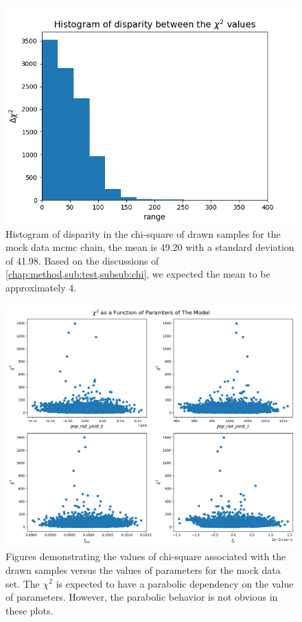 \documentclass[12pt, TexShade, letterpaper]{report}
\begin{document}
\begin{figure}[h!]
\centering
\includegraphics[scale =0.7]{csq_hist_known_curve.png}
\caption[Histogram of disparity in the chi-square of drawn samples for the mock data \gls{mcmc} chain]{Histogram of disparity in the chi-square of drawn samples for the mock data \gls{mcmc} chain, the mean is 49.20 with a standard deviation of 41.98. Based on the discussions of \ref{chap:method,sub:test,subsub:chi}, we expected the mean to be approximately 4.}
\label{fig:csq_hist_known_curve}
\end{figure}

\begin{figure}[h!]
\centering
\includegraphics[scale =0.5]{csq_vs_params_known_curve.png}
\caption[Chi-Square of Drawn samples as a function of parameter values for the mock data]{Figures demonstrating the values of chi-square associated with the drawn samples versus the values of parameters for the mock data set. The $\chi^2$ is
expected to have a parabolic dependency on the value of parameters. However, the parabolic behavior is not obvious in these plots.}
\label{fig:csq_vs_params_knwon_curve}
\end{figure}
\end{document}
